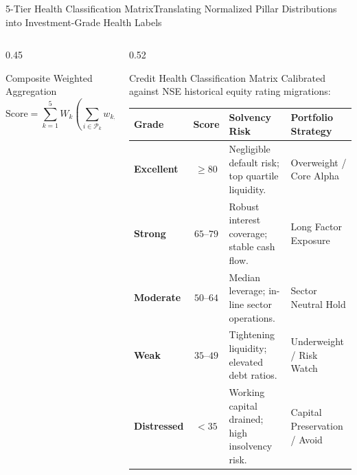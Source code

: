 \begin{frame}{5-Tier Health Classification Matrix}{Translating Normalized Pillar Distributions into Investment-Grade Health Labels}
\begin{columns}[T,onlytextwidth]
\begin{column}{0.45\textwidth}
\begin{tcolorbox}
                \vspace{4pt}
                \begin{mathcard}[top=2pt, bottom=2pt]{Composite Weighted Aggregation}
                    \fontsize{5.5pt}{6.9pt}\selectfont
                    \begin{equation*}
                        \textstyle \text{Score} = \sum_{k=1}^5 W_k \left( \sum_{i \in \mathcal{P}_k} w_{k,i}' \cdot S(x_i) \right) \in [0, 100]
                    \end{equation*}
                \end{mathcard}
            \end{tcolorbox}
        \end{column}

        \begin{column}{0.52\textwidth}
            \begin{quantcard}[height=5.60cm]{Credit Health Classification Matrix}
                \fontsize{5.2pt}{6.4pt}\selectfont
                Calibrated against NSE historical equity rating migrations:
                \vspace{2pt}

                \renewcommand{\arraystretch}{0.98}
                \begin{tabularx}{\linewidth}{>{\bfseries}l c >{\raggedright\arraybackslash}X >{\raggedright\arraybackslash}X}
                    \toprule
                    \textbf{\color{deepemerald}Grade} & \textbf{\color{deepemerald}Score} & \textbf{\color{deepemerald}Solvency Risk} & \textbf{\color{deepemerald}Portfolio Strategy} \\
                    \midrule
                    Excellent & $\ge 80$ & Negligible default risk; top quartile liquidity. & Overweight / Core Alpha \\
                    \rowcolor{cardinner}
                    Strong & $65\text{--}79$ & Robust interest coverage; stable cash flow. & Long Factor Exposure \\
                    Moderate & $50\text{--}64$ & Median leverage; in-line sector operations. & Sector Neutral Hold \\
                    \rowcolor{cardinner}
                    Weak & $35\text{--}49$ & Tightening liquidity; elevated debt ratios. & Underweight / Risk Watch \\
                    Distressed & $< 35$ & Working capital drained; high insolvency risk. & Capital Preservation / Avoid \\
                    \bottomrule
                \end{tabularx}


\end{quantcard}
\end{column}
\end{columns}
\end{frame}

